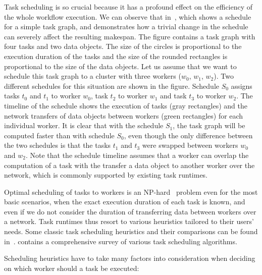 Task scheduling is so crucial because it has a profound effect on the efficiency of the whole
workflow execution. We can observe that in~, which shows a schedule for a
simple task graph, and demonstrates how a trivial change in the schedule can severely affect the
resulting makespan. The figure contains a task graph with four tasks and two data objects. The size
of the circles is proportional to the execution duration of the tasks and the size of the rounded
rectangles is proportional to the size of the data objects. Let us assume that we want to schedule
this task graph to a cluster with three workers ($w_0$, $w_1$,
$w_2$). Two different schedules for this situation are shown in the figure.
Schedule $S_0$ assigns tasks $t_0$ and $t_1$ to
worker $w_0$, task $t_2$ to worker $w_1$ and
task $t_3$ to worker $w_2$. The timeline of the schedule shows
the execution of tasks (gray rectangles) and the network transfers of data objects between workers
(green rectangles) for each individual worker. It is clear that with the schedule
$S_1$, the task graph will be computed faster than with schedule
$S_0$, even though the only difference between the two schedules is that the tasks
$t_1$ and $t_3$ were swapped between workers
$w_0$ and $w_2$. Note that the schedule timeline assumes that a
worker can overlap the computation of a task with the transfer a data object to another worker over
the network, which is commonly supported by existing task runtimes.

Optimal scheduling of tasks to workers is an NP-hard~\cite{Ullman1975} problem even for the
most basic scenarios, when the exact execution duration of each task is known, and even if we do
not consider the duration of transferring data between workers over a network. Task runtimes thus
resort to various heuristics tailored to their users' needs. Some classic task scheduling
heuristics and their comparisons can be found in~\cite{hlfet1974,kwok1998benchmarking,hagras2003static,wang2018list,estee}. 
contains a comprehensive survey of various task scheduling algorithms.

Scheduling heuristics have to take many factors into consideration when deciding on which worker
should a task be executed:


